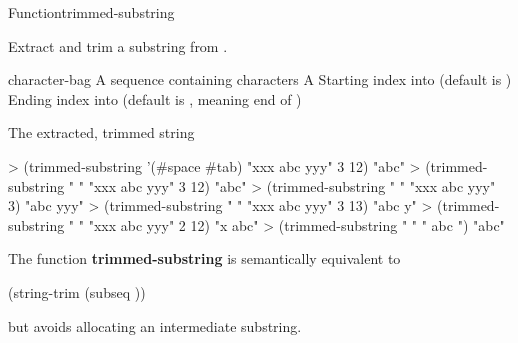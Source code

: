 \documentclass[10pt,twoside,english,pdftex]{article}
\begin{document}

\begin{functiondoc}{Function}{trimmed-substring}%
  { 
     
    \returns{} }
% 

\fnsyntax

\fnpurpose Extract and trim a substring from .

\fnpackage {}

\fnmodule {}

\fnargs
\begin{args}{character-bag}
 A sequence containing characters
\arg[string] A 
\arg[start] Starting index into  (default is )
\arg[end] Ending index into  (default is \nil, meaning
end of )
\end{args}

\fnreturns The extracted, trimmed string

\fnexamples
%
\W\supp
\begin{example}
> (trimmed-substring '(#\bkslash{}space #\bkslash{}tab) "xxx   abc   yyy" 3 12)
"abc"
> (trimmed-substring " " "xxx   abc   yyy" 3 12)
"abc"\goodpagebreak
> (trimmed-substring " " "xxx   abc   yyy" 3)
"abc   yyy"\goodpagebreak
> (trimmed-substring " " "xxx   abc   yyy" 3 13)
"abc   y"
> (trimmed-substring " " "xxx   abc   yyy" 2 12)
"x   abc"
> (trimmed-substring " " "   abc   ")
"abc"
\end{example}

\fnnote 
The function \textbf{trimmed-substring} is semantically equivalent to
%
\W\supp
\begin{example}
  (string-trim  (subseq ))
\end{example} 
%
but avoids allocating an intermediate substring.

\end{functiondoc}

\end{document}
